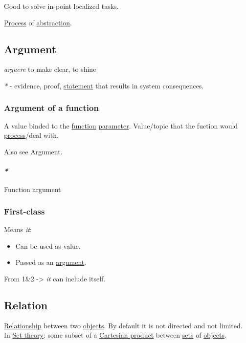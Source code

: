 \documentclass[a4paper,14pt,oneside]{book}
\begin{document}
Good to solve in-point localized tasks.

\hyperref[org8b072db]{Process} of \hyperref[org550217a]{abstraction}.

\subsection{\label{org7be5baf}Argument}
\label{sec:org6740543}
\emph{arguere} to make clear, to shine

\emph{*} - evidence, proof, \hyperref[org4d229e5]{statement} that results in system consequences.

\subsubsection{\label{org8c9a721}Argument of a function}
\label{sec:orge3cff84}
A value binded to the \hyperref[orgc39a15c]{function} \hyperref[org08c9428]{parameter}. Value/topic that the fuction would \hyperref[org8b072db]{process}/deal with.

Also see \label{org80750df}Argument.

\paragraph{\emph{*}}
\label{sec:org5d0582d}

\label{org736de93}Function argument

\subsubsection{\label{org213a48a}First-class}
\label{sec:orgd6e5690}
Means \emph{it}:
\begin{itemize}
\item Can be used as value.
\item Passed as an \hyperref[org7be5baf]{argument}.
\end{itemize}
From 1\&2 -> \emph{it} can include itself.

\subsection{\label{orgdeb75cd}Relation}
\label{sec:orgd530438}
\hyperref[org8fea1c1]{Relationship} between two \hyperref[org88e24d2]{objects}.
By default it is not directed and not limited.
In \hyperref[org4ca1efe]{Set theory}: some subset of a \hyperref[org1a506c4]{Cartesian product} between \hyperref[org8162ad1]{sets} of \hyperref[org88e24d2]{objects}.
\end{document}
